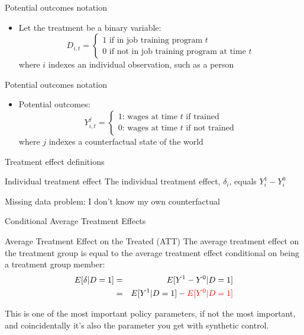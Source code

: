 \documentclass{beamer}
\begin{document}
\begin{frame}{Potential outcomes notation}
	
	\begin{itemize}
	\item Let the treatment be a binary variable: $$D_{i,t} =\begin{cases} 1 \text{ if in job training program $t$} \\ 0 \text{ if not in job training program at time $t$} \end{cases}$$where $i$ indexes an individual observation, such as a person

	\end{itemize}
\end{frame}

\begin{frame}{Potential outcomes notation}
	
	\begin{itemize}

	\item Potential outcomes: $$Y_{i,t}^j =\begin{cases} 1 \text{: wages at time $t$ if trained} \\ 0 \text{: wages at time $t$ if not trained} \end{cases}$$where $j$ indexes a counterfactual state of the world

	\end{itemize}
\end{frame}



\begin{frame}{Treatment effect definitions}


	\begin{block}{Individual treatment effect}
	    The individual treatment effect,  $\delta_i$, equals $Y_i^1-Y_i^0$
	\end{block}

Missing data problem:  I don't know my own counterfactual
	
\end{frame}


\begin{frame}{Conditional Average Treatment Effects}	
	\begin{block}{Average Treatment Effect on the Treated (ATT)}
	The average treatment effect on the treatment group is equal to the average treatment effect conditional on being a treatment group member:
		\begin{eqnarray*}
		E[\delta|D=1]&=&E[Y^1-Y^0|D=1] \nonumber \\
		&=&E[Y^1|D=1]-\textcolor{red}{E[Y^0|D=1]}
		\end{eqnarray*}
	\end{block}
	
	\bigskip

This is one of the most important policy parameters, if not the most important, and coincidentally it's also the parameter you get with synthetic control.  

	
\end{frame}
\end{document}
